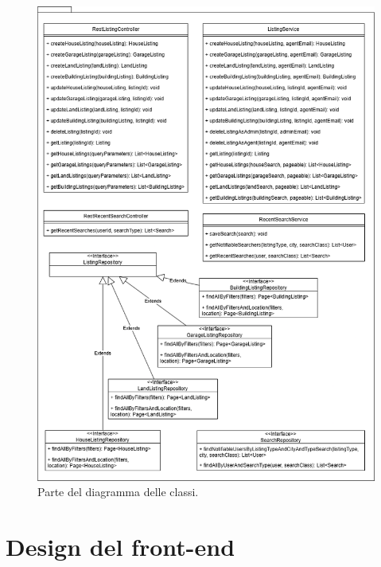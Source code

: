 \begin{figure}[h]
    \centering
    \includegraphics[width=\textwidth]{assets/diagrams/class-diagram/class-diagram-4.png}
    \caption{Parte del diagramma delle classi.}
    \label{fig:Parte 4 del diagramma delle classi}
\end{figure}

\section{Design del front-end}